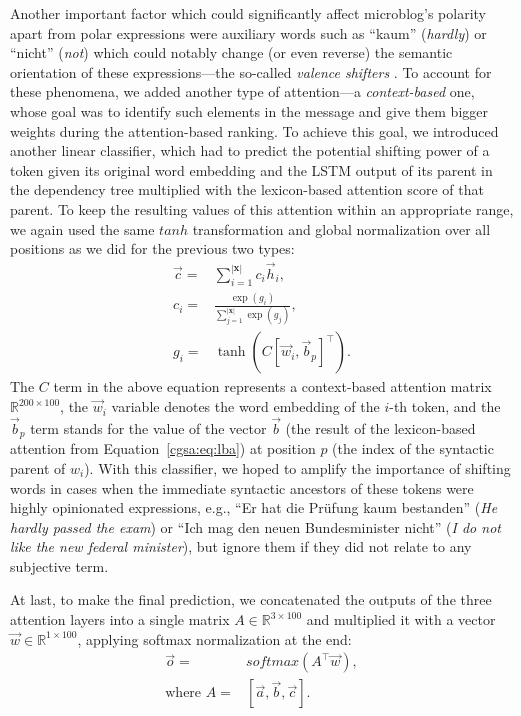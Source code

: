 Another important factor which could significantly affect microblog's
polarity apart from polar expressions were auxiliary words such as
``kaum'' (\emph{hardly}) or ``nicht'' (\emph{not}) which could notably
change (or even reverse) the semantic orientation of these
expressions---the so-called \emph{valence shifters}
\cite[][]{Polanyi:06}.  To account for these phenomena, we added
another type of attention---a \emph{context-based} one, whose goal was
to identify such elements in the message and give them bigger weights
during the attention-based ranking.  To achieve this goal, we
introduced another linear classifier, which had to predict the
potential shifting power of a token given its original word embedding
and the LSTM output of its parent in the dependency tree multiplied
with the lexicon-based attention score of that parent.  To keep the
resulting values of this attention within an appropriate range, we
again used the same $tanh$ transformation and global normalization
over all positions as we did for the previous two types:
\begin{align*}
  \vec{c} =& \sum_{i=1}^{|\mathbf{x}|}c_i\vec{h}_i,\\ c_i =&
  \frac{\exp(g_i)}{\sum_{j=1}^{|\mathbf{x}|}\exp(g_j)},\\ g_i =&
  \tanh\left(C [\vec{w}_i, \vec{b}_p]^\top\right).
\end{align*}
The $C$ term in the above equation represents a context-based
attention matrix $\mathbb{R}^{200 \times 100}$, the $\vec{w}_i$
variable denotes the word embedding of the $i$-th token, and the
$\vec{b}_p$ term stands for the value of the vector $\vec{b}$ (the
result of the lexicon-based attention from Equation~\ref{cgsa:eq:lba})
at position $p$ (the index of the syntactic parent of $w_i$).  With
this classifier, we hoped to amplify the importance of shifting words
in cases when the immediate syntactic ancestors of these tokens were
highly opinionated expressions, e.g., ``Er hat die Pr\"ufung kaum
bestanden'' (\textit{He hardly passed the exam}) or ``Ich mag den
neuen Bundesminister nicht'' (\textit{I do not like the new federal
  minister}), but ignore them if they did not relate to any subjective
term.

At last, to make the final prediction, we concatenated the outputs of
the three attention layers into a single matrix $A\in\mathbb{R}^{3
  \times 100}$ and multiplied it with a vector
$\vec{w}\in\mathbb{R}^{1\times 100}$, applying softmax normalization
at the end:
\begin{align*}
  \vec{o} =& softmax\left(A^\top\vec{w}\right),\\ \textrm{where }A =&
      [\vec{a}, \vec{b}, \vec{c}].
\end{align*}

